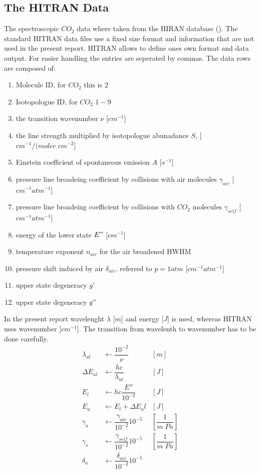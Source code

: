 \subsection{The HITRAN Data}

The spectroscopic $CO_2$ data where taken from the HIRAN database (\cite{hitran1}). The standard HITRAN data files use a fixed size format and information that are not used in the present report. HITRAN allows to define ones own format and data output. For easier handling the entries are seperated by commas. The data rows are composed of: 
\begin{enumerate}
	\item Molecule ID, for $CO_2$ this is $2$			
 	\item Isotopologue ID, for $CO_2$ $1-9$			
 	\item the transition wavenumber $\nu$	[$cm^{-1}$]		
    \item the line strength multiplied by isotopologue abunadance $S$, [$cm^{-1}/(molec \;cm^{-2}$]		
 	\item Einstein coefficient of spontaneous emission $A$ [$s^{-1}$]		
 	\item pressure line broadeing coefficient by collisions with air molecules $\gamma_{air}$ [$cm^{-1} atm^{-1}$]		
 	\item pressure line broadeing coefficient by collisions with $CO_2$ molecules $\gamma_{self}$ [$cm^{-1} atm^{-1}$]		
	\item energy of the lower state $E"$ [$cm^{-1}$]		
	\item temperature exponent $n_{air}$ for the air broadened HWHM			
	\item pressure shift induced by air $\delta_{air}$, referred to $p = 1 atm$ [$cm^{-1} atm^{-1}$] 		
	\item upper state degeneracy $g'$			
	\item upper state degeneracy $g"$
\end{enumerate}
In the present report wavelenght $\lambda$ [$m$] and energy [$J$] is used, whereas HITRAN uses wavenumber [$cm^{-1}$]. The transition from wavelenth to wavenumber has to be done carefully.  
\begin{align*}
	\lambda_{ul}     & \leftarrow \dfrac{10^{-2}}{\nu}               & [m]                   \\
	\Delta E_{ul}    & \leftarrow \dfrac{h  c}{\lambda_{ul}}         & [J]                   \\
 	E_l              & \leftarrow h  c  \dfrac{E''}{10^{-2}}         & [J]                   \\
	E_u              & \leftarrow E_l + \Delta E_ul                  & [J]                   \\
	\gamma_a         & \leftarrow \dfrac{\gamma_{air}}{10^{-2}}  10^{-5} & \left[\dfrac{1}{m \; Pa}\right] \\
	\gamma_s         & \leftarrow \dfrac{\gamma_{self}}{10^{-2}}  10^{-5} & \left[\dfrac{1}{m \; Pa}\right] \\
	\delta_a         & \leftarrow \dfrac{\delta_{air}}{10^{-2}}  10^{-5} &
\end{align*}

